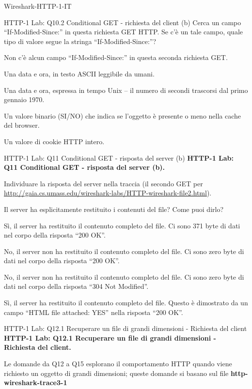 \documentclass[a4paper]{article}
\begin{document}
\begin{quiz}{Wireshark-HTTP-1-IT}
\begin{multi}[points=1,shuffle]{HTTP-1 Lab: Q10.2 Conditional GET - richiesta del client (b)}
Cerca un campo ``If-Modified-Since:'' in questa richiesta GET HTTP. Se c'è un tale campo, quale tipo di valore segue la stringa ``If-Modified-Since:''? 
\item Non c'è alcun campo ``If-Modified-Since:'' in questa seconda richiesta GET.
\item* Una data e ora, in testo ASCII leggibile da umani.
\item Una data e ora, espressa in tempo Unix -- il numero di secondi trascorsi dal primo gennaio 1970.
\item Un valore binario (SI/NO) che indica se l'oggetto è presente o meno nella cache del browser.
\item Un valore di cookie HTTP intero.
\end{multi}

\begin{multi}[points=1,shuffle]{HTTP-1 Lab: Q11 Conditional GET - risposta del server (b)}
\textbf{HTTP-1 Lab: Q11 Conditional GET - risposta del server (b).} 

Individuare la risposta del server nella traccia (il secondo GET per \href{http://gaia.cs.umass.edu/wireshark-labs/HTTP-wireshark-file2.html}{http://gaia.cs.umass.edu/wireshark-labs/HTTP-wireshark-file2.html}). 

Il server ha esplicitamente restituito i contenuti del file? Come puoi dirlo?
\item Sì, il server ha restituito il contenuto completo del file. Ci sono 371 byte di dati nel corpo della risposta ``200 OK''.
\item No, il server non ha restituito il contenuto completo del file. Ci sono zero byte di dati nel corpo della risposta ``200 OK''.
\item* No, il server non ha restituito il contenuto completo del file. Ci sono zero byte di dati nel corpo della risposta ``304 Not Modified''.
\item Sì, il server ha restituito il contenuto completo del file. Questo è dimostrato da un campo ``HTML file attached: YES'' nella risposta ``200 OK''.
\end{multi}

\begin{shortanswer}[points=1]{HTTP-1 Lab: Q12.1 Recuperare un file di grandi dimensioni - Richiesta del client}
\textbf{HTTP-1 Lab: Q12.1 Recuperare un file di grandi dimensioni - Richiesta del client.} 

Le domande da Q12 a Q15 esplorano il comportamento HTTP quando viene richiesto un oggetto di grandi dimensioni; queste domande si basano sul file \textbf{http-wireshark-trace3-1}


\end{shortanswer}
\end{quiz}
\end{document}
